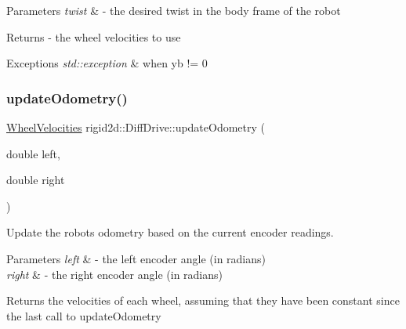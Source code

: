\begin{DoxyParams}{Parameters}
{\em twist} & -\/ the desired twist in the body frame of the robot \\
\hline
\end{DoxyParams}
\begin{DoxyReturn}{Returns}
-\/ the wheel velocities to use 
\end{DoxyReturn}

\begin{DoxyExceptions}{Exceptions}
{\em std\+::exception} & when yb != 0 \\
\hline
\end{DoxyExceptions}
\mbox{\label{classrigid2d_1_1DiffDrive_aa037844753d585eca7023bfd935e084b}} 
\subsubsection{\texorpdfstring{update\+Odometry()}{updateOdometry()}}
{\footnotesize\ttfamily \hyperlink{structrigid2d_1_1WheelVelocities}{Wheel\+Velocities} rigid2d\+::\+Diff\+Drive\+::update\+Odometry (\begin{DoxyParamCaption}\item[{double}]{left,  }\item[{double}]{right }\end{DoxyParamCaption})}



Update the robot\textquotesingle{}s odometry based on the current encoder readings. 


\begin{DoxyParams}{Parameters}
{\em left} & -\/ the left encoder angle (in radians) \\
\hline
{\em right} & -\/ the right encoder angle (in radians) \\
\hline
\end{DoxyParams}
\begin{DoxyReturn}{Returns}
the velocities of each wheel, assuming that they have been constant since the last call to update\+Odometry 
\end{DoxyReturn}
\mbox{\label{classrigid2d_1_1DiffDrive_a34f3a4df7a14565563a6b56d8eef2b9b}} 
